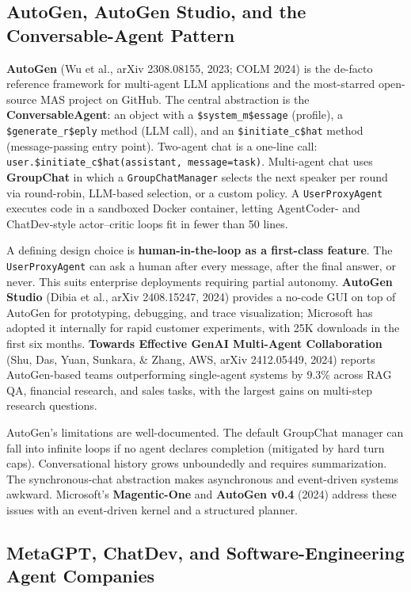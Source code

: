 \subsection{AutoGen, AutoGen Studio, and the Conversable-Agent Pattern}\label{autogen-autogen-studio-and-the-conversable-agent-pattern}

\textbf{AutoGen} (Wu et al., arXiv 2308.08155, 2023; COLM 2024) is the de-facto reference framework for multi-agent LLM applications and the most-starred open-source MAS project on GitHub. The central abstraction is the \textbf{ConversableAgent}: an object with a \texttt{\$system\_m\$essage} (profile), a \texttt{\$generate\_r\$eply} method (LLM call), and an \texttt{\$initiate\_c\$hat} method (message-passing entry point). Two-agent chat is a one-line call: \texttt{user.\$initiate\_c\$hat(assistant,\ message=task)}. Multi-agent chat uses \textbf{GroupChat} in which a \texttt{GroupChatManager} selects the next speaker per round via round-robin, LLM-based selection, or a custom policy. A \texttt{UserProxyAgent} executes code in a sandboxed Docker container, letting AgentCoder- and ChatDev-style actor--critic loops fit in fewer than 50 lines.

A defining design choice is \textbf{human-in-the-loop as a first-class feature}. The \texttt{UserProxyAgent} can ask a human after every message, after the final answer, or never. This suits enterprise deployments requiring partial autonomy. \textbf{AutoGen Studio} (Dibia et al., arXiv 2408.15247, 2024) provides a no-code GUI on top of AutoGen for prototyping, debugging, and trace visualization; Microsoft has adopted it internally for rapid customer experiments, with 25K downloads in the first six months. \textbf{Towards Effective GenAI Multi-Agent Collaboration} (Shu, Das, Yuan, Sunkara, \& Zhang, AWS, arXiv 2412.05449, 2024) reports AutoGen-based teams outperforming single-agent systems by 9.3\% across RAG QA, financial research, and sales tasks, with the largest gains on multi-step research questions.

AutoGen's limitations are well-documented. The default GroupChat manager can fall into infinite loops if no agent declares completion (mitigated by hard turn caps). Conversational history grows unboundedly and requires summarization. The synchronous-chat abstraction makes asynchronous and event-driven systems awkward. Microsoft's \textbf{Magentic-One} and \textbf{AutoGen v0.4} (2024) address these issues with an event-driven kernel and a structured planner.

\subsection{MetaGPT, ChatDev, and Software-Engineering Agent Companies}\label{metagpt-chatdev-and-software-engineering-agent-companies}

